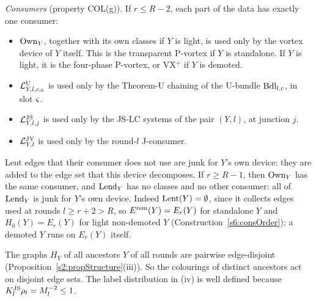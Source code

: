 \begin{definition}
\emph{Consumers} (property COL(g)). If $r\le R-2$, each part of the data
has exactly one consumer:
\begin{itemize}
\item $\mathrm{Own}_Y$, together with its own classes if $Y$ is light, is used
  only by the vortex device of $Y$ itself. This is the transparent
  P-vortex if $Y$ is standalone. If $Y$ is light, it is the four-phase
  P-vortex, or VX$^+$ if $Y$ is demoted.
\item $\mathcal{L}^{\mathrm{U}}_{Y,l,c,\varsigma}$ is used only by the Theorem-U chaining of the
  U-bundle $\mathrm{Bdl}_{l,c}$, in slot $\varsigma$.
\item $\mathcal{L}^{\mathrm{JS}}_{Y,l,j}$ is used only by the JS-LC systems of the pair
  $(Y,l)$, at junction $j$.
\item $\mathcal{L}^{\mathrm{JV}}_{Y,l}$ is used only by the round-$l$ J-consumer.
\end{itemize}
Lent edges that their consumer does not use are junk for $Y$'s own
device: they are added to the edge set that this device decomposes.
If $r\ge R-1$, then $\mathrm{Own}_Y$ has the same consumer, and $\mathrm{Lend}_Y$ has no
classes and no other consumer: all of $\mathrm{Lend}_Y$ is junk for $Y$'s own
device. Indeed $\mathrm{Lent}(Y)=\emptyset$, since it collects edges used at
rounds $l\ge r+2>R$, so $E^{\mathrm{rem}}(Y)=E_r(Y)$ for standalone $Y$ and
$H_0(Y)=E_r(Y)$ for light non-demoted $Y$ (Construction~\ref{s6:consOrder});
a demoted $Y$ runs on $E_r(Y)$ itself.
\deps{\ref{s2:defAncestors}, \ref{s2:propStructure}, \ref{s2:lemTower}}
\end{definition}

The graphs $H_Y$ of all ancestors $Y$ of all rounds are pairwise
edge-disjoint (Proposition~\ref{s2:propStructure}(iii)). So the
colourings of distinct ancestors act on disjoint edge sets. The label
distribution in (iv) is well defined because
$K^{\mathrm{JS}}_l\rho_l=M_l^{-2}\le1$.

